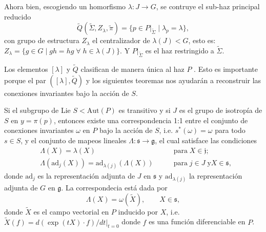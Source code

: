 Ahora bien, escogiendo un homorfismo $\lambda: J \longrightarrow G$, se contruye el sub-haz principal reducido
%
\begin{equation}
\label{eq:ReduceBundleQ}
\tilde{Q}(\tilde{\Sigma}, Z_{\lambda}, \tilde{\pi}) = \{p \in P \vert_{\tilde{\Sigma}} \; \vert \; \lambda_{p} = \lambda\},
\end{equation}
%
con grupo de estructura $Z_{\lambda}$ el centralizador de $\lambda(J) < G$, esto es: $Z_{\lambda} = \{g \in G \; \vert \; gh = hg \; \forall \; h \in \lambda(J)\}.$ Y $P \vert_{\tilde{\Sigma}}$ es el haz restringido a $\tilde{\Sigma}$.

Los elementos $[\lambda]$ y $\tilde{Q}$ clasifican de manera \'{u}nica al haz $P$ \cite{Brodbeck}. Esto es importante porque el par $([\lambda], \tilde{Q})$ y los siguientes teoremas \cite{Kobayashi} nos ayudar\'{a}n a reconstruir las conexiones invariantes bajo la acci\'{o}n de $S$.

\begin{thm}
\label{thm:theorem1}
Si el subgrupo de Lie $S < \mathrm{Aut} (P)$ es transitivo y si $J$ es el grupo de isotrop\'{i}a de $S$ en $y = \pi(p)$, entonces existe una correspondencia 1:1 entre el conjunto de conexiones invariantes $\omega$ en $P$ bajo la acci\'{o}n de $S$, i.e. $s^{*}(\omega) = \omega$ para todo $s \in S$, y el conjunto de mapeos lineales $\Lambda: \mathfrak{s} \longrightarrow \mathfrak{g}$, el cual satisface las condiciones
%
\begin{align}
\label{eq:LambdaCond1}
& \Lambda (X) = \lambda (X) & \mathrm{para} \; X\in \mathfrak{j}; \\
\label{eq:LambdaCond2}
& \Lambda (\mathrm{ad}_{j} (X)) = \mathrm{ad}_{\lambda (j)} (\Lambda (X)) \qquad & \mathrm{para} \; j \in J \; \mathrm{y} X \in \mathfrak{s},
\end{align}
%
donde $\mathrm{ad}_{j}$ es la representaci\'{o}n adjunta de $J$ en $\mathfrak{s}$ y $\mathrm{ad}_{\lambda (j)}$ la representaci\'{o}n adjunta de $G$ en $\mathfrak{g}$. La correspondecia est\'{a} dada por
%
\begin{equation}
\label{eq:correspondence}
\Lambda (X) = \omega (\tilde{X}), \qquad X \in \mathfrak{s},
\end{equation}
%
donde $\tilde{X}$ es el campo vectorial en $P$ inducido por $X$, i.e. $\tilde{X}(f) = d(\exp(t X) \cdot f)/dt \vert_{t=0}$ donde $f$ es una funci\'{o}n diferenciable en $P$.
\end{thm}

